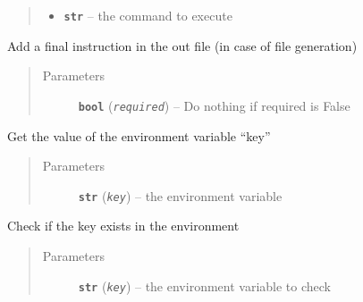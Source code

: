 \documentclass[a4paper,10pt,english]{sphinxmanual}
\begin{document}
\begin{fulllineitems}
\begin{fulllineitems}
\begin{quote}
\begin{description}
\begin{itemize}
\item {} 
\textbf{\texttt{str}} -- the command to execute

\end{itemize}

\end{description}\end{quote}

\end{fulllineitems}


\begin{fulllineitems}
\label{commands/apidoc/src:src.fileEnviron.FileEnviron.finish}
Add a final instruction in the out file (in case of file generation)
\begin{quote}\begin{description}
\item[{Parameters}] \leavevmode
\textbf{\texttt{bool}} (\emph{\texttt{required}}) -- Do nothing if required is False

\end{description}\end{quote}

\end{fulllineitems}


\begin{fulllineitems}
\label{commands/apidoc/src:src.fileEnviron.FileEnviron.get}
Get the value of the environment variable ``key''
\begin{quote}\begin{description}
\item[{Parameters}] \leavevmode
\textbf{\texttt{str}} (\emph{\texttt{key}}) -- the environment variable

\end{description}\end{quote}

\end{fulllineitems}


\begin{fulllineitems}
\label{commands/apidoc/src:src.fileEnviron.FileEnviron.is_defined}
Check if the key exists in the environment
\begin{quote}\begin{description}
\item[{Parameters}] \leavevmode
\textbf{\texttt{str}} (\emph{\texttt{key}}) -- the environment variable to check


\end{description}
\end{quote}
\end{fulllineitems}
\end{fulllineitems}
\end{document}
